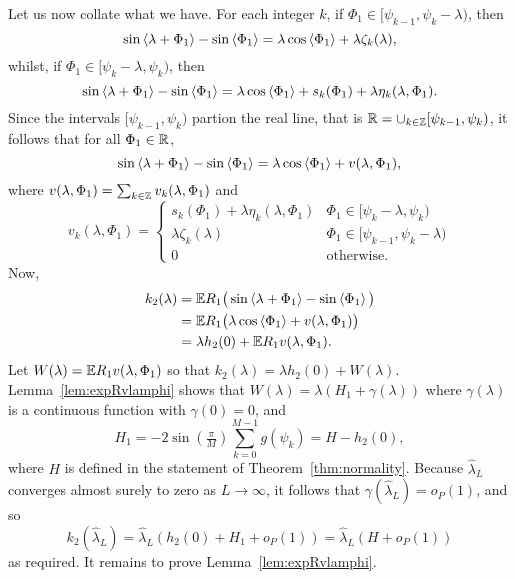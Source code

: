\documentclass[journal]{IEEEtran}
\begin{document}
\begin{IEEEproof}
Let us now collate what we have.  For each integer $k$, if $\Phi_1 \in [\psi_{k-1}, \psi_{k} - \lambda )$, then
\[
\sin\left\langle \lambda + \Phi_1 \right\rangle - \sin\left\langle \Phi_1 \right\rangle = \lambda\cos\left\langle \Phi_1 \right\rangle + \lambda\zeta_k(\lambda),
\]
whilst, if $\Phi_1 \in [ \psi_{k} - \lambda,\psi_{k})$, then
\[
\sin\left\langle \lambda + \Phi_1 \right\rangle - \sin\left\langle \Phi_1 \right\rangle = \lambda \cos\left\langle \Phi_1 \right\rangle + s_k(\Phi_1) + \lambda\eta_k(\lambda, \Phi_1).
\]
Since the intervals $[\psi_{k-1}, \psi_{k})$ partion the real line, that is ${\mathbb R} = \cup_{k\in{\mathbb Z}}[\psi_{k-1}, \psi_{k})$, it follows that for all $\Phi_1 \in {\mathbb R}$,
\[
\sin\left\langle \lambda + \Phi_1 \right\rangle - \sin\left\langle \Phi_1 \right\rangle = \lambda\cos\left\langle \Phi_1 \right\rangle +  v(\lambda, \Phi_1),
\]
where $v(\lambda, \Phi_1) = \sum_{k\in{\mathbb Z}} v_k(\lambda, \Phi_1)$ and
\begin{equation}\label{eq:vk}
v_k(\lambda,\Phi_1) = \begin{cases}
s_k(\Phi_1) + \lambda\eta_k(\lambda, \Phi_1) &  \Phi_1 \in [ \psi_{k} - \lambda,\psi_{k} ) \\
\lambda\zeta_k(\lambda) & \Phi_1 \in [\psi_{k-1}, \psi_{k} - \lambda ) \\
0 & \text{otherwise}.
\end{cases}
\end{equation}
Now,
\begin{align*}
k_2(\lambda) &=  {\mathbb E} R_1\big( \sin\left\langle \lambda + \Phi_1 \right\rangle - \sin\left\langle \Phi_1 \right\rangle \big) \\
&= {\mathbb E} R_1\big( \lambda\cos\left\langle \Phi_1 \right\rangle + v(\lambda, \Phi_1)  \big) \\
&= \lambda h_2(0) + {\mathbb E} R_1 v(\lambda, \Phi_1).
\end{align*}
Let $W(\lambda) = {\mathbb E} R_1 v(\lambda, \Phi_1)$ so that $k_2(\lambda) = \lambda h_2(0) + W(\lambda).$  Lemma~\ref{lem:expRvlamphi} shows that $W(\lambda) =  \lambda(H_1 + \gamma(\lambda))$ where $\gamma(\lambda)$ is a continuous function with $\gamma(0) = 0$, and
\[
H_1 = - 2 \sin(\tfrac{\pi}{M}) \sum_{k = 0}^{M-1} g(\psi_k) = H - h_2(0),
\]
where $H$ is defined in the statement of Theorem~\ref{thm:normality}.  Because $\hat{\lambda}_L$ converges almost surely to zero as $L \rightarrow\infty$, it follows that $\gamma(\hat{\lambda}_L) = o_P(1)$, and so
\[
k_2(\hat{\lambda}_L) = \hat{\lambda}_L ( h_2(0) + H_1 + o_P(1) ) = \hat{\lambda}_L ( H + o_P(1) )
\]
as required.  It remains to prove Lemma~\ref{lem:expRvlamphi}.
\end{IEEEproof}
\end{document}
